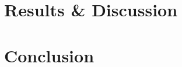 \documentclass[a4paper,12pt]{article}
\begin{document}


\newpage


\section{Results \& Discussion}

\section{Conclusion}

\printbibliography
\end{document}
